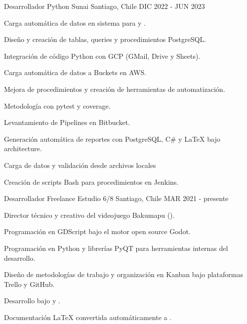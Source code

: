 

\begin{cventries}
	
\cventry
{Desarrollador Python} %
{Sunai} %
{Santiago, Chile} %
{DIC 2022 - JUN 2023} %
{
	\begin{cvitems} %
		\item {Carga automática de datos en sistema  para  y .}
		\item {Diseño y creación de tablas, queries y procedimientos PostgreSQL.}
		\item {Integración de código Python con GCP (GMail, Drive y Sheets).}
		\item {Carga automática de datos a Buckets en AWS.}
		\item {Mejora de procedimientos y creación de herramientas de automatización.}
		\item {Metodología  con pytest y coverage.}
		\item {Levantamiento de Pipelines en Bitbucket.}
		\item {Generación automática de reportes con PostgreSQL, C\# y LaTeX bajo  architecture.}
		\item {Carga de datos y validación desde archivos  locales}
		\item {Creación de scripts Bash para procedimientos en Jenkins.}
	\end{cvitems}
}

  \cventry
    {Desarrollador Freelance} %
    {Estudio 6/8} %
    {Santiago, Chile} %
    {MAR 2021 - presente} %
    {
      \begin{cvitems} %
        \item {Director técnico y creativo del videojuego Bakumapu ().}
        \item {Programación en GDScript bajo el motor open source Godot.}
        \item {Programación en Python y librerías PyQT para herramientas internas del desarrollo.}
        \item {Diseño de metodologías de trabajo y organización en Kanban bajo plataformas Trello y GitHub.}
        \item {Desarrollo bajo  y .}
        \item {Documentación LaTeX convertida automáticamente a .} 
      \end{cvitems}
    }


\end{cventries}
